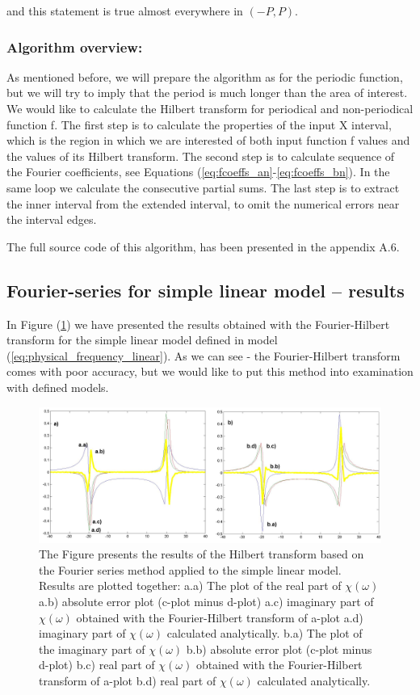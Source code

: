 \documentclass[12pt,twoside,a4paper]{article}
\numberwithin{equation}{subsection}
\numberwithin{figure}{subsection}
\begin{document}
and this statement is true almost everywhere in $(-P, P)$.

\subsubsection*{Algorithm overview:}

As mentioned before, we will prepare the algorithm as for the periodic function, but we will try to imply that the period is much longer than the area of interest. We would like to calculate the Hilbert transform for periodical and non-periodical function f. The first step is to calculate the properties of the input X interval, which is the region in which we are interested of both input function f values and the values of its Hilbert transform. The second step is to calculate sequence of the Fourier coefficients, see Equations (\ref{eq:fcoeffs_an}-\ref{eq:fcoeffs_bn}). In the same loop we calculate the consecutive partial sums. The last step is to extract the inner interval from the extended interval, to omit the numerical errors near the interval edges.

The full source code of this algorithm, has been presented in the appendix A.6.

\subsection{Fourier-series for simple linear model -- results} \label{chap:fourier_lin}

In Figure (\ref{fig:four_lin}) we have presented the results obtained with the Fourier-Hilbert transform for the simple linear model defined in model (\ref{eq:physical_frequency_linear}). As we can see - the Fourier-Hilbert transform comes with poor accuracy, but we would like to put this method into examination with defined models.

\begin{figure} 
  \includegraphics[width=150mm]{img/four_lin.png}
  \caption{ The Figure presents the results of the Hilbert transform based on the Fourier series method applied to the simple linear model. Results are plotted together:
   a.a) The plot of the real part of $\chi (\omega )$ 
   a.b) absolute error plot (c-plot minus d-plot) 
   a.c) imaginary part of $\chi (\omega )$ obtained with the Fourier-Hilbert transform of a-plot 
   a.d) imaginary part of $\chi (\omega )$  calculated analytically. 
   b.a) The plot of the imaginary part of $\chi (\omega )$ 
   b.b) absolute error plot (c-plot minus d-plot) 
   b.c) real part of $\chi (\omega )$ obtained with the Fourier-Hilbert transform of a-plot 
   b.d) real part of $\chi (\omega )$ calculated analytically. \label{fig:four_lin}
  }
\end{figure} 
\end{document}
